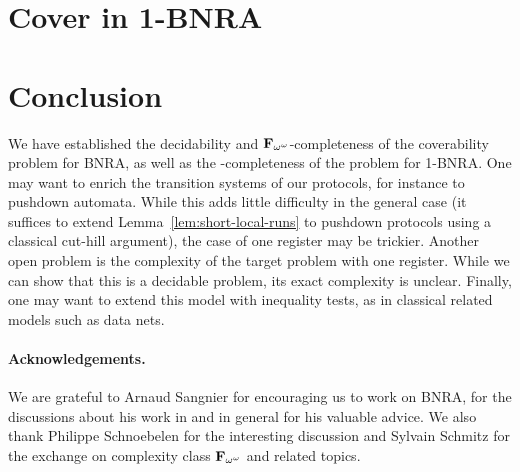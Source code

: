 \documentclass[runningheads]{llncs}
\begin{document}
	
%
	
	
	
	\section{Cover in 1-BNRA}
	\label{sec:cover-1BNRA}
	
	
	
%	
%
	\section{Conclusion}
	We have established the decidability and $\mathbf{F}_{\omega^\omega}$-completeness of the coverability problem for BNRA, as well as the \NP-completeness of the problem for 1-BNRA.
	One may want to enrich the transition systems of our protocols, for instance to pushdown automata. While this adds little difficulty in the general case (it suffices to extend Lemma~\ref{lem:short-local-runs} to pushdown protocols using a classical cut-hill argument), the case of one register may be trickier.
	Another open problem is the complexity of the target problem with one register. While we can show that this is a decidable problem, its exact complexity is unclear. 
	Finally, one may want to extend this model with inequality tests, as in classical related models such as data nets.
	
	\paragraph*{Acknowledgements.} We are grateful to Arnaud Sangnier for encouraging us to work on BNRA, for the discussions about his work in \cite{DelzannoST13} and in general for his valuable advice. We also thank Philippe Schnoebelen for the interesting discussion and Sylvain Schmitz for the exchange on complexity class $\mathbf{F}_{\omega^{\omega}}$ and related topics.   
	
	
	\newpage
	
	\appendix
%	
	 
	
	

	
	
	
	
	
	
\end{document}
